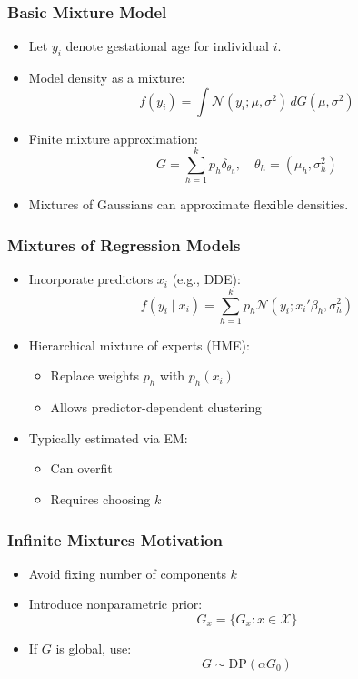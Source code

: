 \documentclass[12pt,oneside]{book}
\numberwithin{equation}{section}
\theoremstyle{definition}
\theoremstyle{plain}
\theoremstyle{remark}
\begin{document}
\subsubsection*{Basic Mixture Model}
\begin{itemize}
\item Let $y_i$ denote gestational age for individual $i$.
\item Model density as a mixture:
\[
f(y_i) = \int \mathcal{N}(y_i; \mu, \sigma^2)\, dG(\mu, \sigma^2)
\]
\item Finite mixture approximation:
\[
G = \sum_{h=1}^k p_h \delta_{\theta_h}, \quad \theta_h = (\mu_h, \sigma_h^2)
\]
\item Mixtures of Gaussians can approximate flexible densities.
\end{itemize}

\subsubsection*{Mixtures of Regression Models}
\begin{itemize}
\item Incorporate predictors $x_i$ (e.g., DDE):
\[
f(y_i \mid x_i) = \sum_{h=1}^k p_h \mathcal{N}(y_i; x_i'\beta_h, \sigma_h^2)
\]
\item Hierarchical mixture of experts (HME):
\begin{itemize}
\item Replace weights $p_h$ with $p_h(x_i)$
\item Allows predictor-dependent clustering
\end{itemize}
\item Typically estimated via EM:
\begin{itemize}
\item Can overfit
\item Requires choosing $k$
\end{itemize}
\end{itemize}

\subsubsection*{Infinite Mixtures Motivation}
\begin{itemize}
\item Avoid fixing number of components $k$
\item Introduce nonparametric prior:
\[
G_x = \{G_x : x \in \mathcal{X}\}
\]
\item If $G$ is global, use:
\[
G \sim \mathrm{DP}(\alpha G_0)
\]
\end{itemize}
\end{document}
